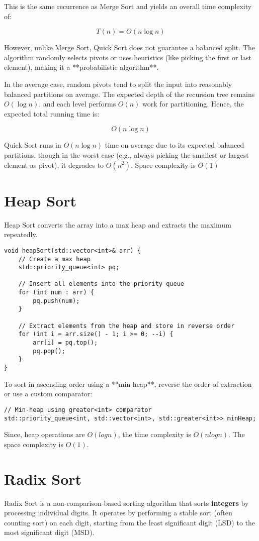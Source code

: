 \documentclass{article}
\begin{document}
This is the same recurrence as Merge Sort and yields an overall time complexity of:

\[
T(n) = O(n \log n)
\]

However, unlike Merge Sort, Quick Sort does not guarantee a balanced split. The algorithm randomly selects pivots or uses heuristics (like picking the first or last element), making it a **probabilistic algorithm**.

In the average case, random pivots tend to split the input into reasonably balanced partitions on average. The expected depth of the recursion tree remains $O(\log n)$, and each level performs $O(n)$ work for partitioning. Hence, the expected total running time is:

\[
O(n \log n)
\]

Quick Sort runs in $O(n \log n)$ time on average due to its expected balanced partitions, though in the worst case (e.g., always picking the smallest or largest element as pivot), it degrades to $O(n^2)$. Space complexity is $O(1)$

\section{Heap Sort}
Heap Sort converts the array into a max heap and extracts the maximum repeatedly.

\begin{lstlisting}[style=cppstyle]
void heapSort(std::vector<int>& arr) {
    // Create a max heap
    std::priority_queue<int> pq;

    // Insert all elements into the priority queue
    for (int num : arr) {
        pq.push(num);
    }

    // Extract elements from the heap and store in reverse order
    for (int i = arr.size() - 1; i >= 0; --i) {
        arr[i] = pq.top();
        pq.pop();
    }
}
\end{lstlisting}

To sort in ascending order using a **min-heap**, reverse the order of extraction or use a custom comparator:

\begin{lstlisting}[style=cppstyle]
// Min-heap using greater<int> comparator
std::priority_queue<int, std::vector<int>, std::greater<int>> minHeap;
\end{lstlisting}

Since, heap operations are $O(log n)$, the time complexity is $O(n log n)$. The space complexity is $O(1)$.

\section{Radix Sort}
Radix Sort is a non-comparison-based sorting algorithm that sorts \textbf{integers} by processing individual digits. It operates by performing a stable sort (often counting sort) on each digit, starting from the least significant digit (LSD) to the most significant digit (MSD).
\end{document}
